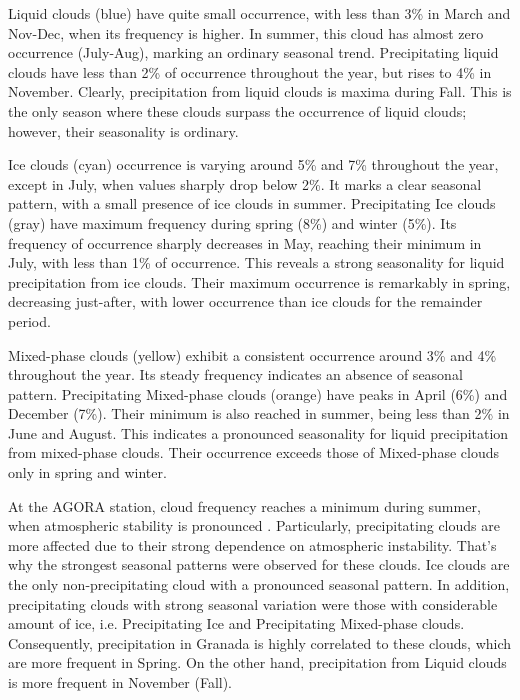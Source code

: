 Liquid clouds (blue) have quite small occurrence, with less than 3\% in March and Nov-Dec, when its frequency is higher. In summer, this cloud has almost zero occurrence (July-Aug), marking an ordinary seasonal trend. Precipitating liquid clouds have less than 2\% of occurrence throughout the year, but rises to 4\% in November. Clearly, precipitation from liquid clouds is maxima during Fall. This is the only season where these clouds surpass the occurrence of liquid clouds; however, their seasonality is ordinary.

Ice clouds (cyan) occurrence is varying around 5\% and 7\% throughout the year, except in July, when values sharply drop below 2\%. It marks a clear seasonal pattern, with a small presence of ice clouds in summer. Precipitating Ice clouds (gray) have maximum frequency during spring (8\%) and winter (5\%). Its frequency of occurrence sharply decreases in May, reaching their minimum in July, with less than 1\% of occurrence. This reveals a strong seasonality for liquid precipitation from ice clouds. Their maximum occurrence is remarkably in spring, decreasing just-after, with lower occurrence than ice clouds for the remainder period.

Mixed-phase clouds (yellow) exhibit a consistent occurrence around 3\% and 4\% throughout the year. Its steady frequency indicates an absence of seasonal pattern. Precipitating Mixed-phase clouds (orange) have peaks in April (6\%) and December (7\%). Their minimum is also reached in summer, being less than 2\% in June and August. This indicates a pronounced seasonality for liquid precipitation from mixed-phase clouds. Their occurrence exceeds those of Mixed-phase clouds only in spring and winter.

At the AGORA station, cloud frequency reaches a minimum during summer, when atmospheric stability is pronounced \citep{bedoya-velasquezSeasonalAnalysisAtmosphere2019}. Particularly, precipitating clouds are more affected due to their strong dependence on atmospheric instability. That's why the strongest seasonal patterns were observed for these clouds. Ice clouds are the only non-precipitating cloud with a pronounced seasonal pattern. In addition, precipitating clouds with strong seasonal variation were those with considerable amount of ice, i.e. Precipitating Ice and Precipitating Mixed-phase clouds. Consequently, precipitation in Granada is highly correlated to these clouds, which are more frequent in Spring. On the other hand, precipitation from Liquid clouds is more frequent in November (Fall). 

